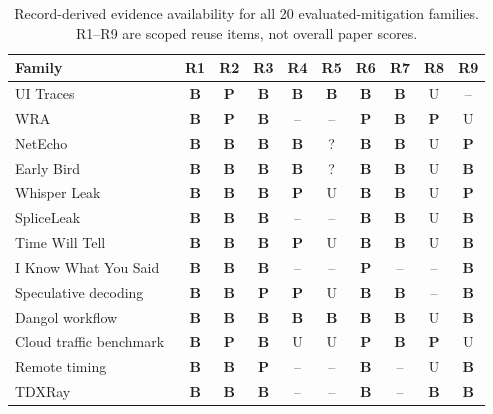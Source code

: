 \begin{table}[t]\centering\footnotesize
\caption{Record-derived evidence availability for all 20 evaluated-mitigation families. R1--R9 are scoped reuse items, not overall paper scores.}\label{tab:family-audit}
\setlength{\tabcolsep}{2.2pt}
\begin{tabularx}{\columnwidth}{@{}Y*{9}{c}@{}}\toprule
Family & R1 & R2 & R3 & R4 & R5 & R6 & R7 & R8 & R9\\\midrule
UI Traces~\cite{uitraces2026} & \textbf{B} & \textbf{P} & \textbf{B} & \textbf{B} & \textbf{B} & \textbf{B} & \textbf{B} & U & --\\
WRA~\cite{jeong2026wra} & \textbf{B} & \textbf{P} & \textbf{B} & -- & -- & \textbf{P} & \textbf{B} & \textbf{P} & U\\
NetEcho~\cite{netecho2025} & \textbf{B} & \textbf{B} & \textbf{B} & \textbf{B} & ? & \textbf{B} & \textbf{B} & U & \textbf{P}\\
Early Bird~\cite{earlybird2025} & \textbf{B} & \textbf{B} & \textbf{B} & \textbf{B} & ? & \textbf{B} & \textbf{B} & U & \textbf{B}\\
Whisper Leak~\cite{whisperleak2025} & \textbf{B} & \textbf{B} & \textbf{B} & \textbf{P} & U & \textbf{B} & \textbf{B} & U & \textbf{P}\\
SpliceLeak~\cite{spliceleak2026} & \textbf{B} & \textbf{B} & \textbf{B} & -- & -- & \textbf{B} & \textbf{B} & U & \textbf{B}\\
Time Will Tell~\cite{timewilltell2024} & \textbf{B} & \textbf{B} & \textbf{B} & \textbf{P} & U & \textbf{B} & \textbf{B} & U & \textbf{B}\\
I Know What You Said~\cite{gao2025iknow} & \textbf{B} & \textbf{B} & \textbf{B} & -- & -- & \textbf{P} & -- & -- & \textbf{B}\\
Speculative decoding~\cite{wei2024speculation} & \textbf{B} & \textbf{B} & \textbf{P} & \textbf{P} & U & \textbf{B} & \textbf{B} & -- & \textbf{B}\\
Dangol workflow~\cite{dangol2026workflow} & \textbf{B} & \textbf{B} & \textbf{B} & \textbf{B} & \textbf{B} & \textbf{B} & \textbf{B} & U & \textbf{B}\\
Cloud traffic benchmark~\cite{pouryousef2026traffic} & \textbf{B} & \textbf{P} & \textbf{B} & U & U & \textbf{P} & \textbf{B} & \textbf{P} & U\\
Remote timing~\cite{carlini2024remote} & \textbf{B} & \textbf{B} & \textbf{P} & -- & -- & \textbf{B} & -- & U & \textbf{B}\\
TDXRay~\cite{hornetz2026tdxray} & \textbf{B} & \textbf{B} & \textbf{B} & -- & -- & \textbf{B} & -- & \textbf{B} & \textbf{B}\\

\end{tabularx}
\end{table}
